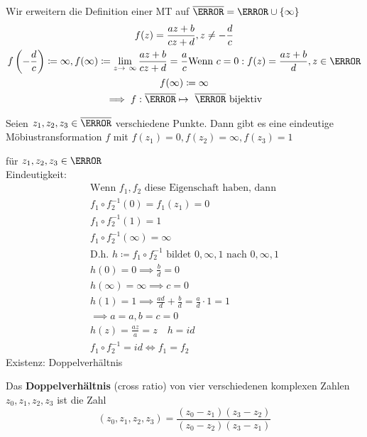 Wir erweitern die Definition einer MT auf $\overline{\C} = \C \cup \{ \infty \}$
\begin{gather*}
	f(z) = \frac{az + b}{cz + d} , z \neq -\frac{d}{c} \\
	f\left( -\frac{d}{c} \right) \coloneqq \infty , f(\infty) \coloneqq \lim_{z \rightarrow \infty} \frac{az + b}{cz + d} = \frac{a}{c}
	\text{Wenn } c = 0 : f(z) = \frac{az + b }{d} , z \in \C \\
	f(\infty) \coloneqq \infty \\
	\implies f: \overline{\C} \mapsto \overline{\C} \text{ bijektiv}
\end{gather*}
\begin{satz*}
	Seien $z_1 , z_2 , z_3 \in \overline{\C}$ verschiedene Punkte. Dann gibt es eine eindeutige Möbiustransformation $f$ mit $f(z_1) = 0 , f(z_2) = \infty , f(z_3) = 1$
	\begin{bew}
		für $z_1 , z_2 , z_3 \in \C$ \\
		Eindeutigkeit: \\
		\begin{gather*}
			\text{Wenn } f_1 , f_2 \text{ diese Eigenschaft haben, dann} \\
			f_1 \circ f_2^{-1}(0) = f_1(z_1) = 0 \\
			f_1 \circ f_2^{-1}(1) = 1 \\
			f_1 \circ f_2^{-1}(\infty) = \infty \\
			\text{D.h. } h \coloneqq f_1 \circ f_2^{-1} \text{ bildet } 0 , \infty , 1 \text{ nach } 0 , \infty , 1 \\
			h(0) = 0 \implies \frac{b}{d} = 0 \\
			h(\infty) = \infty \implies c = 0 \\
			h(1) = 1 \implies \frac{ad}{d} + \frac{b}{d} = \frac{a}{d} \cdot 1 = 1 \\
			\implies a = a , b = c = 0 \\
			h(z) = \frac{az}{a} = z \quad h = id \\
			f_1 \circ f_2^{-1} = id \iff f_1 = f_2
		\end{gather*}
		Existenz: Doppelverhältnis
		\begin{def*}[note = Doppelverhältnis , index = Doppelverhältnis]
			Das \textbf{Doppelverhältnis} (cross ratio) von vier verschiedenen komplexen Zahlen $z_0 , z_1 , z_2 , z_3$ ist die Zahl
			\[ ( z_0 , z_1 , z_2 , z_3 ) =  \frac{(z_0 - z_1)(z_3 - z_2)}{(z_0 - z_2)(z_3 - z_1)} \]
		\end{def*}
		\begin{beh}

\end{beh}
\end{bew}
\end{satz*}
